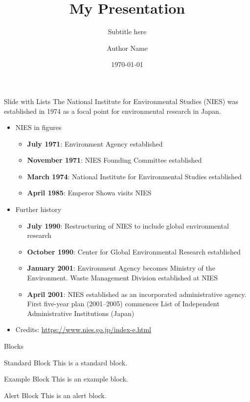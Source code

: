 \documentclass[aspectratio=169]{beamer}
\title{My Presentation}
\subtitle{Subtitle here}
\author{Author Name}
\institute{Affiliation(s)}
\date{\today}
\begin{document}
\titleframe

\begin{frame}[t]{Slide with Lists}
The National Institute for Environmental Studies (NIES) was established in 1974 as a focal point for environmental research in Japan.
	\begin{itemize}
		\item NIES in figures
			\begin{itemize}
				\item \textbf{July 1971}: Environment Agency established
				\item \textbf{November 1971}: NIES Founding Committee established
				\item \textbf{March 1974}: National Institute for Environmental Studies established
				\item \textbf{April 1985}: Emperor Showa visits NIES
			\end{itemize}
		\item Further history
			\begin{itemize}
				\item \textbf{July 1990}: Restructuring of NIES to include global environmental research
				\item \textbf{October 1990}: Center for Global Environmental Research established
				\item \textbf{January 2001}: Environment Agency becomes Ministry of the Environment. Waste Management Division established at NIES
				\item \textbf{April 2001}: NIES established as an incorporated administrative agency. First five-year plan (2001–2005) commences List of Independent Administrative Institutions (Japan)
			\end{itemize}
		\item Credits: \url{https://www.nies.go.jp/index-e.html}
	\end{itemize}
\end{frame}

\begin{frame}[t]{Blocks}
	\begin{block}{Standard Block}
		This is a standard block.
	\end{block}
	
	\begin{exampleblock}{Example Block}
		This is an example block.
	\end{exampleblock}
	
	\begin{alertblock}{Alert Block}
		This is an alert block.
	\end{alertblock}
\end{frame}
\end{document}
